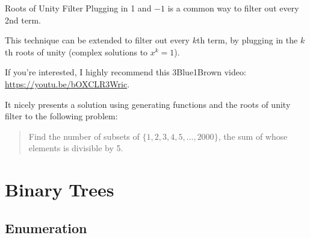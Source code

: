 \documentclass[aspectratio=169]{beamer}
\begin{document}
\begin{frame}{Roots of Unity Filter}
  Plugging in 1 and $-1$ is a common way to filter out every 2nd term.
  \pause

  This technique can be extended to filter out every $k$th term, by plugging in the $k$th roots of unity (complex solutions to $x^k = 1$).
  \pause

  If you're interested, I highly recommend this 3Blue1Brown video:
  \href{https://youtu.be/bOXCLR3Wric}{https://youtu.be/bOXCLR3Wric}.

  It nicely presents a solution using generating functions and the roots of unity filter to the following problem: 
  \newline

  \begin{quote}
    Find the number of subsets of $\{1, 2, 3, 4, 5, \dots, 2000\}$,
    the sum of whose elements is divisible by 5.
  \end{quote}
\end{frame}

\section{Binary Trees}
\frame{\sectionpage}

\subsection{Enumeration}
\frame{\subsectionpage}
\end{document}
